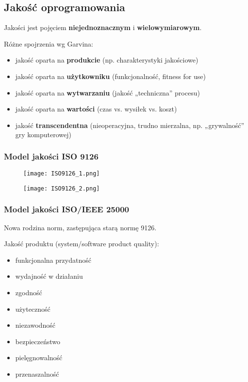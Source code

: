 \documentclass[../main.tex]{subfiles}
\begin{document}
    \subsection{Jakość oprogramowania}
    Jakości jest pojęciem \textbf{niejednoznacznym} i \textbf{wielowymiarowym}.

    Różne spojrzenia wg Garvina:
    \begin{itemize}
        \item jakość oparta na \textbf{produkcie} (np. charakterystyki jakościowe)
        \item jakość oparta na \textbf{użytkowniku} (funkcjonalność, fitness for use)
        \item jakość oparta na \textbf{wytwarzaniu} (jakość „techniczna” procesu)
        \item jakość oparta na \textbf{wartości} (czas vs. wysiłek vs. koszt)
        \item jakość \textbf{transcendentna} (nieoperacyjna, trudno mierzalna, np. „grywalność” gry komputerowej)
    \end{itemize}


    \subsubsection{Model jakości ISO 9126}
    \begin{figure}[H]
        \texttt{[image: ISO9126\_1.png]}
    \end{figure}

    \begin{figure}[H]
        \texttt{[image: ISO9126\_2.png]}
    \end{figure}

    \subsubsection{Model jakości ISO/IEEE 25000}
    Nowa rodzina norm, zastępująca starą normę 9126.


    Jakość produktu (system/software product quality):
    \begin{itemize}
        \item funkcjonalna przydatność
        \item wydajność w działaniu
        \item zgodność
        \item użyteczność
        \item niezawodność
        \item bezpieczeństwo
        \item pielęgnowalność
        \item przenaszalność
    \end{itemize}
\end{document}
